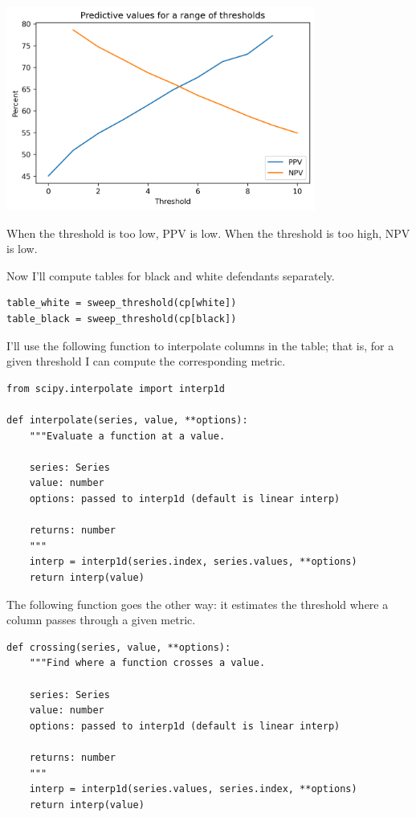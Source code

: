 \begin{center}
\includegraphics[width=4in]{chapters/02_calibration_files/02_calibration_39_0.png}
\end{center}

When the threshold is too low, PPV is low. When the threshold is too
high, NPV is low.

Now I'll compute tables for black and white defendants separately.

\begin{lstlisting}[]
table_white = sweep_threshold(cp[white])
table_black = sweep_threshold(cp[black])
\end{lstlisting}

I'll use the following function to interpolate columns in the table;
that is, for a given threshold I can compute the corresponding metric.

\begin{lstlisting}[]
from scipy.interpolate import interp1d

def interpolate(series, value, **options):
    """Evaluate a function at a value.
    
    series: Series
    value: number
    options: passed to interp1d (default is linear interp)
    
    returns: number
    """
    interp = interp1d(series.index, series.values, **options)
    return interp(value)
\end{lstlisting}

The following function goes the other way: it estimates the threshold
where a column passes through a given metric.

\begin{lstlisting}[]
def crossing(series, value, **options):
    """Find where a function crosses a value.
    
    series: Series
    value: number
    options: passed to interp1d (default is linear interp)
    
    returns: number
    """
    interp = interp1d(series.values, series.index, **options)
    return interp(value)
\end{lstlisting}

